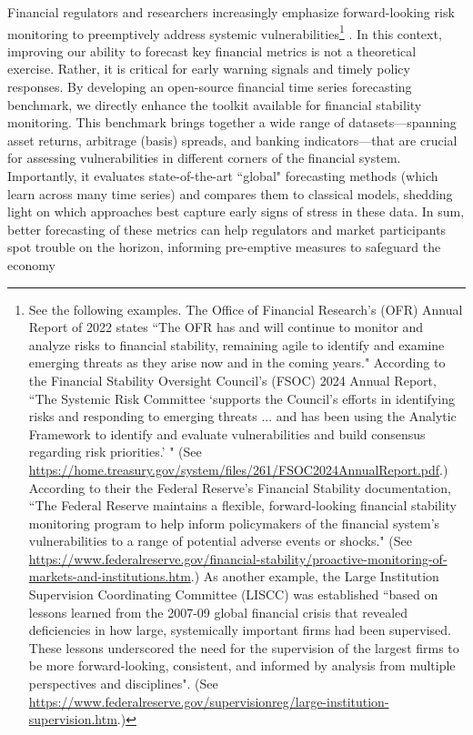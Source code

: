 \documentclass{article}
\begin{document}
Financial regulators and researchers increasingly emphasize forward-looking risk monitoring to preemptively address systemic vulnerabilities\footnote{
    See the following examples. The Office of Financial Research's (OFR) Annual Report of 2022 states ``The OFR has and will continue to monitor and analyze risks to financial
    stability, remaining agile to identify and examine emerging threats as they arise now and in the coming years." 
    According to the Financial Stability Oversight Council's (FSOC) 2024 Annual Report, ``The Systemic Risk Committee `supports the Council's efforts in identifying risks and responding to emerging threats
    ... and has been using the Analytic Framework to identify and evaluate vulnerabilities and build consensus regarding risk priorities.' " (See \url{https://home.treasury.gov/system/files/261/FSOC2024AnnualReport.pdf}.)
    According to their the Federal Reserve's Financial Stability documentation, ``The Federal Reserve maintains a flexible, forward-looking financial stability monitoring program to help inform policymakers of the financial system's vulnerabilities to a range of potential adverse events or shocks." (See \url{https://www.federalreserve.gov/financial-stability/proactive-monitoring-of-markets-and-institutions.htm}.) 
    As another example, the Large Institution Supervision Coordinating Committee (LISCC) was established ``based on lessons learned from the 2007-09 global financial crisis that revealed deficiencies in how large, systemically important firms had been supervised. These lessons underscored the need for the supervision of the largest firms to be more forward-looking, consistent, and informed by analysis from multiple perspectives and disciplines". (See \url{https://www.federalreserve.gov/supervisionreg/large-institution-supervision.htm}.)
} \citep{Adrian2015}. 
In this context, improving our ability to forecast key financial metrics is not a theoretical exercise. Rather,
it is critical for early warning signals and timely policy responses. 
By developing an open-source financial time series forecasting benchmark, we directly enhance the toolkit available for financial stability monitoring. This benchmark brings together a wide range of datasets---spanning asset returns, arbitrage (basis) spreads, and banking indicators---that are crucial for assessing vulnerabilities in different corners of the financial system. Importantly, it evaluates state-of-the-art ``global" forecasting methods (which learn across many time series) and compares them to classical models, shedding light on which approaches best capture early signs of stress in these data. In sum, better forecasting of these metrics can help regulators and market participants spot trouble on the horizon, informing pre-emptive measures to safeguard the economy
\end{document}
